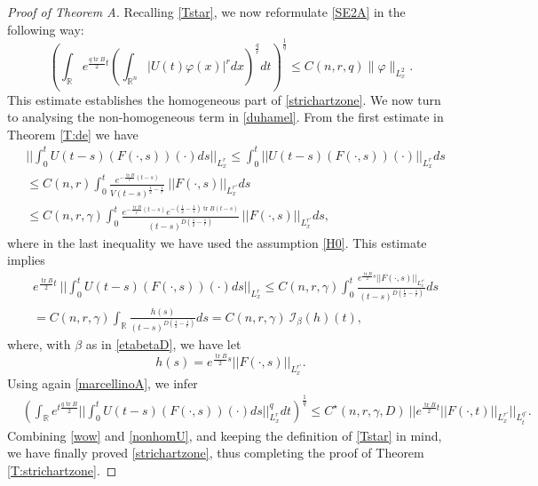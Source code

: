 \documentclass[11pt,letter]{amsart}
\def \R {\mathbb{R}}
\def \vf{\varphi}
\newcommand{\Rn}{\mathbb R^n}
\numberwithin{equation}{section}
\newcommand{\tr}{\operatorname{tr}}
\numberwithin{equation}{section}
\begin{document}
\begin{proof}[Proof of Theorem A]
Recalling \eqref{Tstar}, we now reformulate \eqref{SE2A} in the following way:
\begin{equation}\label{wow}
\left(\int_\R e^{\frac{q\tr B}2 t}  \left(\int_{\Rn}|U(t)\vf(x)|^r dx\right)^{\frac qr} dt\right)^{\frac 1q} \le C(n,r,q) \|\vf\|_{L^2_x}.
\end{equation}
This estimate establishes the homogeneous part of \eqref{strichartzone}. We now turn to analysing the non-homogeneous term in \eqref{duhamel}.
From the first estimate in Theorem \ref{T:de} we have
\begin{align*}
& ||\int_0^t U(t-s)(F(\cdot,s))(\cdot) ds||_{L^r_x}\le \int_0^t ||U(t-s)(F(\cdot,s))(\cdot)||_{L^r_x} ds
\\
& \le C(n,r) \int_0^t \frac{e^{-\frac{\tr B}{r}(t-s)}}{V(t-s)^{\frac 12 - \frac 1{r}}}\ ||F(\cdot,s)||_{L^{r'}_x} ds
\\
& \le C(n,r,\gamma) \int_0^t \frac{e^{-\frac{\tr B}{r}(t-s)} e^{-\left(\frac 12 - \frac 1{r}\right) \tr B (t-s)}}{(t-s)^{D\left(\frac 12 - \frac 1{r}\right)}}\ ||F(\cdot,s)||_{L^{r'}_x} ds,
\end{align*}
where in the last inequality we have used the assumption \eqref{H0}. This estimate implies 
\begin{align*}
& e^{\frac{\tr B}{2} t}\ ||\int_0^t U(t-s)(F(\cdot,s))(\cdot) ds||_{L^r_x} \le C(n,r,\gamma) \int_0^t \frac{e^{\frac{\tr B}{2} s} ||F(\cdot,s)||_{L^{r'}_x}}{(t-s)^{D\left(\frac 12 - \frac 1{r}\right)}} ds
\\
& = C(n,r,\gamma) \int_\R \frac{h(s)}{(t-s)^{D\left(\frac 12 - \frac 1{r}\right)}} ds = C(n,r,\gamma)\ \mathcal I_\beta(h)(t),
\end{align*}
where, with $\beta$ as in \eqref{etabetaD}, we have let
\[
h(s) = e^{\frac{\tr B}{2} s} ||F(\cdot,s)||_{L^{r'}_x}.
\]
Using again \eqref{marcellinoA}, we infer
\begin{align}\label{nonhomU}
& \left(\int_\R e^{t \frac{q\tr B}2} ||\int_0^t U(t-s)(F(\cdot,s))(\cdot) ds||^q_{L^r_x} dt\right)^{\frac 1q}
 \le C^\star(n,r,\gamma,D)\ ||e^{\frac{\tr B}{2} t} ||F(\cdot,t)||_{L^{r'}_x}||_{L^{q'}_t}.
\end{align}
Combining \eqref{wow} and \eqref{nonhomU}, and keeping the definition of \eqref{Tstar} in mind, we have finally proved \eqref{strichartzone}, thus completing the proof of Theorem \ref{T:strichartzone}.

\end{proof}
\end{document}
